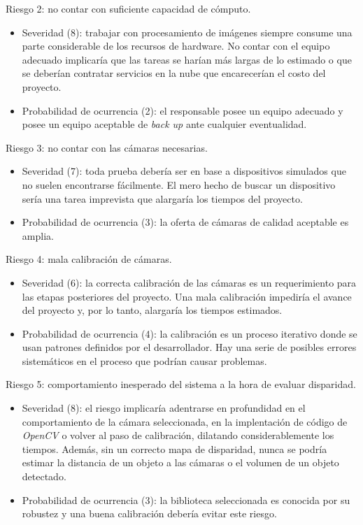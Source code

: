 \documentclass[
11pt, %
]{charter}
\begin{document}
Riesgo 2: no contar con suficiente capacidad de cómputo.
\begin{itemize}
	\item Severidad (8): trabajar con procesamiento de imágenes siempre consume una parte considerable de los recursos de hardware. No contar con el equipo adecuado implicaría que las tareas se harían más largas de lo estimado o que se deberían contratar servicios en la nube que encarecerían el costo del proyecto.
	\item Probabilidad de ocurrencia (2): el responsable posee un equipo adecuado y posee un equipo aceptable de \emph{back up} ante cualquier eventualidad. 
\end{itemize}

Riesgo 3: no contar con las cámaras necesarias. 
\begin{itemize}
	\item Severidad (7): toda prueba debería ser en base a dispositivos simulados que no suelen encontrarse fácilmente. El mero hecho de buscar un dispositivo sería una tarea imprevista que alargaría los tiempos del proyecto.
	\item Probabilidad de ocurrencia (3): la oferta de cámaras de calidad aceptable es amplia. 
\end{itemize}

Riesgo 4: mala calibración de cámaras.
\begin{itemize}
	\item Severidad (6): la correcta calibración de las cámaras es un requerimiento para las etapas posteriores del proyecto. Una mala calibración impediría el avance del proyecto y, por lo tanto, alargaría los tiempos estimados.
	\item Probabilidad de ocurrencia (4): la calibración es un proceso iterativo donde se usan patrones definidos por el desarrollador. Hay una serie de posibles errores sistemáticos en el proceso que podrían causar problemas. 
\end{itemize}

Riesgo 5: comportamiento inesperado del sistema a la hora de evaluar disparidad. 
\begin{itemize}
	\item Severidad (8): el riesgo implicaría adentrarse en profundidad en el comportamiento de la cámara seleccionada, en la implentación de código de \emph{OpenCV} o volver al paso de calibración, dilatando considerablemente los tiempos. Además, sin un correcto mapa de disparidad, nunca se podría estimar la distancia de un objeto a las cámaras o el volumen de un objeto detectado.
	\item Probabilidad de ocurrencia (3): la biblioteca seleccionada es conocida por su robustez y una buena calibración debería evitar este riesgo.
\end{itemize}
\end{document}
